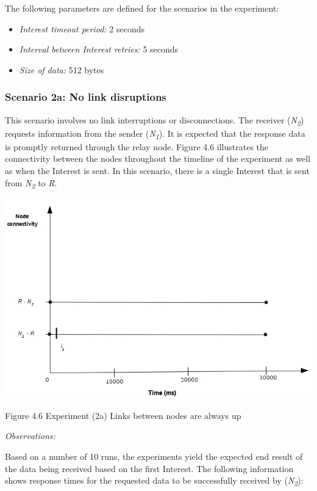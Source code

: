 \documentclass[a4paper,12pt]{report}      %
\begin{document}
\noindent The following parameters are defined for the scenarios in the experiment:
\begin{itemize}
\item \textsl{Interest timeout period:}  2 seconds
\item \textsl{Interval between Interest retries:} 5 seconds
\item \textsl{Size of data:} 512 bytes
\end{itemize}

\subsubsection{Scenario 2a: No link disruptions}

This scenario involves no link interruptions or disconnections. The receiver (\emph{N\textsubscript{2}}) requests information from
the sender (\emph{N\textsubscript{1}}). It is expected that the response data is promptly returned through the relay node. Figure 4.6 illustrates the connectivity between the nodes throughout the timeline of the experiment as well as when the Interest is sent. In this scenario, there is a single Interest that is sent from \emph{N\textsubscript{2}} to \emph{R}.

\noindent\includegraphics[scale=0.55]{exp2a_timediag.jpg}\newline
\begin{center}Figure 4.6 Experiment (2a) Links between nodes are always up\end{center}

\vspace*{1\baselineskip}\noindent\emph{Observations:}

Based on a number of 10 runs, the experiments yield the expected end result of the data being received
based on the first Interest. The following information shows response times for the requested
data to be successfully received by (\emph{N\textsubscript{2}}):
\end{document}
